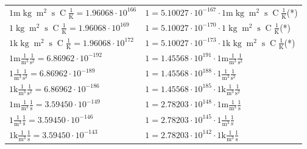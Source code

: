 \begin{center}
\begin{longtable}{l l}
{\color{gray}$1 \bm{\mathrm{ m}}\operatorname{kg}{\operatorname{m}^2}{\operatorname{s}}{\operatorname{C}}\frac1{\operatorname{K}} = 1.96068\cdot10^{166} $}   & {\color{gray}$ 1 = 5.10027\cdot10^{-167} \cdot 1 \bm{\mathrm{ m}}\operatorname{kg}{\operatorname{m}^2}{\operatorname{s}}{\operatorname{C}}\frac1{\operatorname{K}}$}\quad(*)\\
{\color{black}$1 \bm{\mathrm{ }}\operatorname{kg}{\operatorname{m}^2}{\operatorname{s}}{\operatorname{C}}\frac1{\operatorname{K}} = 1.96068\cdot10^{169} $}   & {\color{black}$ 1 = 5.10027\cdot10^{-170} \cdot 1 \bm{\mathrm{ }}\operatorname{kg}{\operatorname{m}^2}{\operatorname{s}}{\operatorname{C}}\frac1{\operatorname{K}}$}\quad(*)\\
{\color{gray}$1 \bm{\mathrm{ k}}\operatorname{kg}{\operatorname{m}^2}{\operatorname{s}}{\operatorname{C}}\frac1{\operatorname{K}} = 1.96068\cdot10^{172} $}   & {\color{gray}$ 1 = 5.10027\cdot10^{-173} \cdot 1 \bm{\mathrm{ k}}\operatorname{kg}{\operatorname{m}^2}{\operatorname{s}}{\operatorname{C}}\frac1{\operatorname{K}}$}\quad(*)\\
\hline{\color{gray}$1 \bm{\mathrm{ m}}\frac1{\operatorname{m}^3}\frac1{\operatorname{s}^2}{}{} = 6.86962\cdot10^{-192} $}   & {\color{gray}$ 1 = 1.45568\cdot10^{191} \cdot 1 \bm{\mathrm{ m}}\frac1{\operatorname{m}^3}\frac1{\operatorname{s}^2}{}{}$}  \\
{\color{black}$1 \bm{\mathrm{ }}\frac1{\operatorname{m}^3}\frac1{\operatorname{s}^2}{}{} = 6.86962\cdot10^{-189} $}   & {\color{black}$ 1 = 1.45568\cdot10^{188} \cdot 1 \bm{\mathrm{ }}\frac1{\operatorname{m}^3}\frac1{\operatorname{s}^2}{}{}$}  \\
{\color{gray}$1 \bm{\mathrm{ k}}\frac1{\operatorname{m}^3}\frac1{\operatorname{s}^2}{}{} = 6.86962\cdot10^{-186} $}   & {\color{gray}$ 1 = 1.45568\cdot10^{185} \cdot 1 \bm{\mathrm{ k}}\frac1{\operatorname{m}^3}\frac1{\operatorname{s}^2}{}{}$}  \\
{\color{gray}$1 \bm{\mathrm{ m}}\frac1{\operatorname{m}^3}\frac1{\operatorname{s}}{}{} = 3.59450\cdot10^{-149} $}   & {\color{gray}$ 1 = 2.78203\cdot10^{148} \cdot 1 \bm{\mathrm{ m}}\frac1{\operatorname{m}^3}\frac1{\operatorname{s}}{}{}$}  \\
{\color{black}$1 \bm{\mathrm{ }}\frac1{\operatorname{m}^3}\frac1{\operatorname{s}}{}{} = 3.59450\cdot10^{-146} $}   & {\color{black}$ 1 = 2.78203\cdot10^{145} \cdot 1 \bm{\mathrm{ }}\frac1{\operatorname{m}^3}\frac1{\operatorname{s}}{}{}$}  \\
{\color{gray}$1 \bm{\mathrm{ k}}\frac1{\operatorname{m}^3}\frac1{\operatorname{s}}{}{} = 3.59450\cdot10^{-143} $}   & {\color{gray}$ 1 = 2.78203\cdot10^{142} \cdot 1 \bm{\mathrm{ k}}\frac1{\operatorname{m}^3}\frac1{\operatorname{s}}{}{}$}  \\

\end{longtable}
\end{center}
